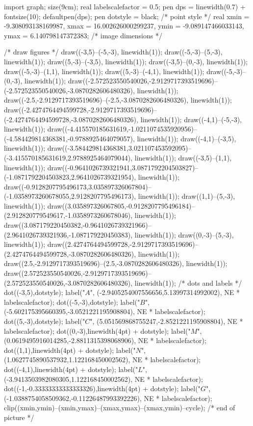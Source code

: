 \documentclass[11pt]{scrartcl}
\begin{document}
	\begin{center}
		\begin{asy}
			import graph; size(9cm); 
			real labelscalefactor = 0.5;
			pen dps = linewidth(0.7) + fontsize(10); defaultpen(dps);
			pen dotstyle = black; /* point style */ 
			real xmin = -9.308093138169987, xmax = 16.002626000299237, ymin = -9.089147466033143, ymax = 6.140798147372383;  /* image dimensions */
			
			/* draw figures */
			draw((-3,5)--(-5,-3), linewidth(1)); 
			draw((-5,-3)--(5,-3), linewidth(1)); 
			draw((5,-3)--(-3,5), linewidth(1)); 
			draw((-3,5)--(0,-3), linewidth(1)); 
			draw((-5,-3)--(1,1), linewidth(1)); 
			draw((5,-3)--(-4,1), linewidth(1)); 
			draw((-5,-3)--(0,-3), linewidth(1)); 
			draw((-2.572523550540026,-2.9129717393519696)--(-2.572523550540026,-3.0870282606480326), linewidth(1)); 
			draw((-2.5,-2.9129717393519696)--(-2.5,-3.0870282606480326), linewidth(1)); 
			draw((-2.4274764494599728,-2.9129717393519696)--(-2.4274764494599728,-3.0870282606480326), linewidth(1)); 
			draw((-4,1)--(-5,-3), linewidth(1)); 
			draw((-4.415570185631619,-1.0211074535920956)--(-4.584429814368381,-0.9788925464079057), linewidth(1)); 
			draw((-4,1)--(-3,5), linewidth(1)); 
			draw((-3.584429814368381,3.021107453592095)--(-3.415570185631619,2.9788925464079044), linewidth(1)); 
			draw((-3,5)--(1,1), linewidth(1)); 
			draw((-0.9641026739321941,3.0871792204503827)--(-1.0871792204503823,2.9641026739321954), linewidth(1)); 
			draw((-0.9128207795496173,3.035897326067804)--(-1.0358973260678055,2.9128207795496173), linewidth(1)); 
			draw((1,1)--(5,-3), linewidth(1)); 
			draw((3.035897326067805,-0.9128207795496184)--(2.912820779549617,-1.0358973260678046), linewidth(1)); 
			draw((3.087179220450382,-0.9641026739321966)--(2.9641026739321936,-1.087179220450383), linewidth(1)); 
			draw((0,-3)--(5,-3), linewidth(1)); 
			draw((2.4274764494599728,-2.9129717393519696)--(2.4274764494599728,-3.0870282606480326), linewidth(1)); 
			draw((2.5,-2.9129717393519696)--(2.5,-3.0870282606480326), linewidth(1)); 
			draw((2.572523550540026,-2.9129717393519696)--(2.572523550540026,-3.0870282606480326), linewidth(1)); 
			/* dots and labels */
			dot((-3,5),dotstyle); 
			label("$A$", (-2.9405254007556656,5.13997314992002), NE * labelscalefactor); 
			dot((-5,-3),dotstyle); 
			label("$B$", (-5.602175395660395,-3.0521221195908804), NE * labelscalefactor); 
			dot((5,-3),dotstyle); 
			label("$C$", (5.051569868755247,-2.8521221195908804), NE * labelscalefactor); 
			dot((0,-3),linewidth(4pt) + dotstyle); 
			label("$M$", (0.0619495916014285,-2.8811315398068906), NE * labelscalefactor); 
			dot((1,1),linewidth(4pt) + dotstyle); 
			label("$N$", (1.0627745890537932,1.122168450002562), NE * labelscalefactor); 
			dot((-4,1),linewidth(4pt) + dotstyle); 
			label("$L$", (-3.9413503982080305,1.122168450002562), NE * labelscalefactor); 
			dot((-1,-0.33333333333333326),linewidth(4pt) + dotstyle); 
			label("$G$", (-1.0388754058509362,-0.11226487993392226), NE * labelscalefactor); 
			clip((xmin,ymin)--(xmin,ymax)--(xmax,ymax)--(xmax,ymin)--cycle); 
			/* end of picture */
		\end{asy}
	\end{center}
	
\end{document}
